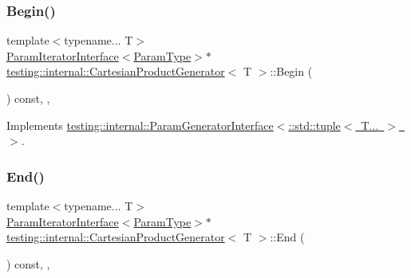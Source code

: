\subsubsection{\texorpdfstring{Begin()}{Begin()}\hspace{0.1cm}{\footnotesize\ttfamily [2/2]}}
{\footnotesize\ttfamily template$<$typename... T$>$ \\
\mbox{\hyperlink{classtesting_1_1internal_1_1_param_iterator_interface}{Param\+Iterator\+Interface}}$<$\mbox{\hyperlink{classtesting_1_1internal_1_1_cartesian_product_generator_af27131157a9347f0c82420ca081ee7dd}{Param\+Type}}$>$$\ast$ \mbox{\hyperlink{classtesting_1_1internal_1_1_cartesian_product_generator}{testing\+::internal\+::\+Cartesian\+Product\+Generator}}$<$ T $>$\+::Begin (\begin{DoxyParamCaption}{ }\end{DoxyParamCaption}) const\hspace{0.3cm}{\ttfamily [inline]}, {\ttfamily [override]}, {\ttfamily [virtual]}}



Implements \mbox{\hyperlink{classtesting_1_1internal_1_1_param_generator_interface_ae1de83b16fe9a53c67778a026c6a9569}{testing\+::internal\+::\+Param\+Generator\+Interface$<$\+::std\+::tuple$<$ T... $>$ $>$}}.

\mbox{\label{classtesting_1_1internal_1_1_cartesian_product_generator_ae072dcf8400ac9dd5692e417262a664b}} 
\subsubsection{\texorpdfstring{End()}{End()}\hspace{0.1cm}{\footnotesize\ttfamily [1/2]}}
{\footnotesize\ttfamily template$<$typename... T$>$ \\
\mbox{\hyperlink{classtesting_1_1internal_1_1_param_iterator_interface}{Param\+Iterator\+Interface}}$<$\mbox{\hyperlink{classtesting_1_1internal_1_1_cartesian_product_generator_af27131157a9347f0c82420ca081ee7dd}{Param\+Type}}$>$$\ast$ \mbox{\hyperlink{classtesting_1_1internal_1_1_cartesian_product_generator}{testing\+::internal\+::\+Cartesian\+Product\+Generator}}$<$ T $>$\+::End (\begin{DoxyParamCaption}{ }\end{DoxyParamCaption}) const\hspace{0.3cm}{\ttfamily [inline]}, {\ttfamily [override]}, {\ttfamily [virtual]}}



